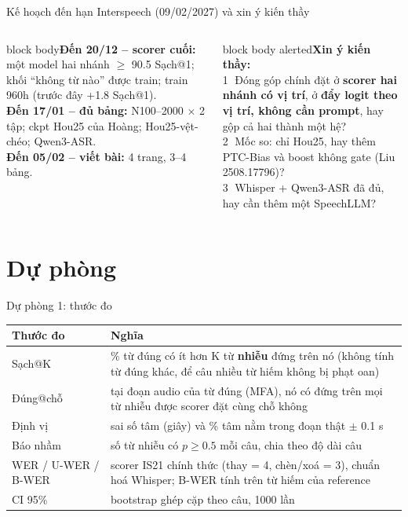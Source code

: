 \documentclass[aspectratio=169,xcolor=table]{beamer}
\newcommand{\nbox}[2][block body]{\begin{beamercolorbox}[sep=0.45em,rounded=true]{#1}\footnotesize #2\end{beamercolorbox}}
\begin{document}
\begin{frame}{Kế hoạch đến hạn Interspeech (09/02/2027) và xin ý kiến thầy}
\centering
{}
\vspace{0.15cm}
\begin{columns}[T]
\nbox{\textbf{Đến 20/12 -- scorer cuối:} một model hai nhánh $\geq$ 90.5 Sạch@1; khối ``không từ nào'' được train; train 960h (trước đây +1.8 Sạch@1).\\[2pt]
\textbf{Đến 17/01 -- đủ bảng:} N100--2000 $\times$ 2 tập; ckpt Hou25 của Hoàng; Hou25-vệt-chéo; Qwen3-ASR.\\[2pt]
\textbf{Đến 05/02 -- viết bài:} 4 trang, 3--4 bảng.}
\nbox[block body alerted]{\textbf{Xin ý kiến thầy:}\\[2pt]
\textcircled{\scriptsize 1} Đóng góp chính đặt ở \textbf{scorer hai nhánh có vị trí}, ở \textbf{đẩy logit theo vị trí, không cần prompt}, hay gộp cả hai thành một hệ?\\[2pt]
\textcircled{\scriptsize 2} Mốc so: chỉ Hou25, hay thêm PTC-Bias và boost không gate (Liu 2508.17796)?\\[2pt]
\textcircled{\scriptsize 3} Whisper + Qwen3-ASR đã đủ, hay cần thêm một SpeechLLM?}
\end{columns}
\end{frame}

\section{Dự phòng}
\begin{frame}{Dự phòng 1: thước đo}
\renewcommand{\arraystretch}{1.25}\footnotesize
\begin{tabular}{L{3.0cm}L{10.6cm}}
\toprule
Thước đo & Nghĩa \\
\midrule
Sạch@K & \% từ đúng có ít hơn K từ \textbf{nhiễu} đứng trên nó (không tính từ đúng khác, để câu nhiều từ hiếm không bị phạt oan) \\
Đúng@chỗ & tại đoạn audio của từ đúng (MFA), nó có đứng trên mọi từ nhiễu được scorer đặt cùng chỗ không \\
Định vị & sai số tâm (giây) và \% tâm nằm trong đoạn thật $\pm$ 0.1 s \\
Báo nhầm & số từ nhiễu có $p \geq 0.5$ mỗi câu, chia theo độ dài câu \\
WER / U-WER / B-WER & scorer IS21 chính thức (thay = 4, chèn/xoá = 3), chuẩn hoá Whisper; B-WER tính trên từ hiếm của reference \\
CI 95\% & bootstrap ghép cặp theo câu, 1000 lần \\
\bottomrule
\end{tabular}
\end{frame}
\end{document}
